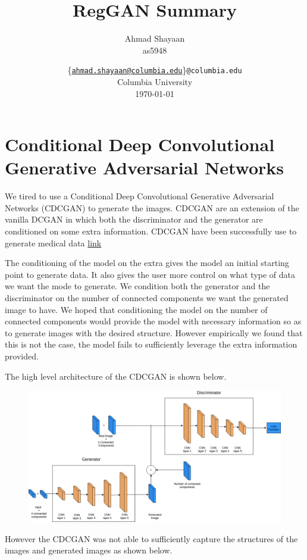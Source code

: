 \documentclass[12pt]{report}
\title{\Large{\textbf{RegGAN Summary}}\\\Large{}}
\author{
    Ahmad Shayaan\\as5948
    }
\date{
\{\href{mailto:ahmad.shayaan@columbia.edu}{\texttt{\small{ahmad.shayaan@columbia.edu}}}\}\texttt{\small{@columbia.edu}}\\
    Columbia University\\
    \today}
\begin{document}
\maketitle

\pagebreak


\section*{Conditional Deep Convolutional Generative Adversarial Networks}
We tired to use a Conditional Deep Convolutional Generative Adversarial
Networks (CDCGAN) to generate the images. CDCGAN are an extension of the vanilla
DCGAN in which both the discriminator and the generator are conditioned on some extra
information. CDCGAN have been successfully use to generate medical data \href{https://openreview.net/forum?id=B1ZZTfZAW}{link}

The conditioning of the model on the extra gives the model an initial starting point to generate data. It also gives the user more control on what type of data we want the mode to generate. We condition both the generator and the discriminator on the number of connected components we want the generated image to have. We hoped that conditioning the model on the number of connected components would provide the model with necessary information so as to generate images with the desired structure. However empirically we found that this is not the case, the model fails to sufficiently leverage the extra information provided.


The high level architecture of the CDCGAN is shown below.

\begin{figure}[H]
	\centering
	\includegraphics[scale=0.45]{CDCGAN}
\end{figure}


However the CDCGAN was not able to sufficiently capture the structures of the images and generated images as shown below.
\end{document}

